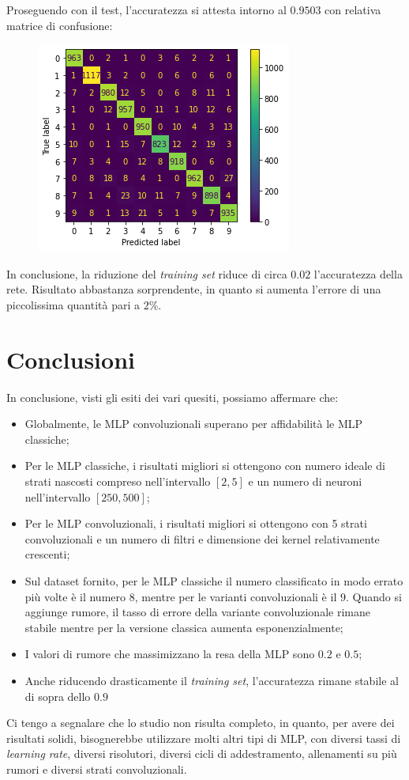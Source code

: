 \documentclass[12pt, a4paper]{article}
\begin{document}
Proseguendo con il test, l'accuratezza si attesta intorno al \(0.9503\) con relativa matrice di confusione:
\begin{figure}[H]
    \centering
    \includegraphics[width=.5\textwidth]{Matrix10.png}
\end{figure}

In conclusione, la riduzione del \textit{training set} riduce di circa \(0.02\) l'accuratezza della rete. Risultato abbastanza sorprendente, in quanto si aumenta l'errore di una piccolissima quantità pari a \(2\%\).

\newpage
\section{Conclusioni}
In conclusione, visti gli esiti dei vari quesiti, possiamo affermare che:
\begin{itemize}
    \item Globalmente, le MLP convoluzionali superano per affidabilità le MLP classiche;
    \item Per le MLP classiche, i risultati migliori si ottengono con numero ideale di strati nascosti compreso nell'intervallo \([2, 5]\) e un numero di neuroni nell'intervallo \([250 , 500]\);
    \item Per le MLP convoluzionali, i risultati migliori si ottengono con 5 strati convoluzionali e un numero di filtri e dimensione dei kernel relativamente crescenti;
    \item Sul dataset fornito, per le MLP classiche il numero classificato in modo errato più volte è il numero \(8\), mentre per le varianti convoluzionali è il \(9\). Quando si aggiunge rumore, il tasso di errore della variante convoluzionale rimane stabile mentre per la versione classica aumenta esponenzialmente;
    \item I valori di rumore che massimizzano la resa della MLP sono \(0.2\) e \(0.5\);
    \item Anche riducendo drasticamente il \textit{training set}, l'accuratezza rimane stabile al di sopra dello \(0.9\)
\end{itemize}

Ci tengo a segnalare che lo studio non risulta completo, in quanto, per avere dei risultati solidi, bisognerebbe utilizzare molti altri tipi di MLP, con diversi tassi di \textit{learning rate}, diversi risolutori, diversi cicli di addestramento, allenamenti su più rumori e diversi strati convoluzionali.
\end{document}
